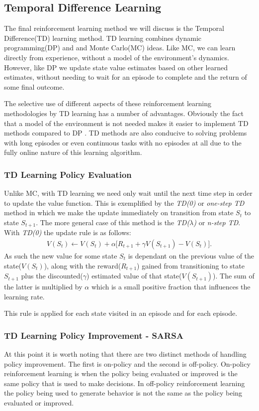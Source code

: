 \subsection{Temporal Difference Learning}\label{subsec:td}
The final reinforcement learning method we will discuss is the Temporal Difference(TD) learning method.
TD learning combines dynamic programming(DP) and and Monte Carlo(MC) ideas\citep{sutton1998reinforcement}.
Like MC, we can learn directly from experience, without a model of the environment's dynamics.
However, like DP we update state value estimates based on other learned estimates, without needing to wait for an
episode to complete and the return of some final outcome.

The selective use of different aspects of these reinforcement learning methodologies by TD learning has
a number of advantages.
Obviously the fact that a model of the environment is not needed makes it easier to implement TD methods
compared to DP .
TD methods are also conducive to solving problems with long episodes or even continuous tasks with no
episodes at all due to the fully online nature of this learning algorithm.

\subsubsection{TD Learning Policy Evaluation}
Unlike MC, with TD learning we need only wait until the next time step in order to update the value function.
This is exemplified by the \textit{TD(0)} or \textit{one-step TD} method in which we make the
update immediately on transition from state $S_t$ to state $S_{t+1}$.
The more general case of this method is the \textit{TD($\lambda$)} or \textit{n-step TD}.
With \textit{TD(0)} the update rule is as follows:
\begin{align}
    V(S_t) \leftarrow V(S_t) + \alpha \lbrack R_{t+1} + \gamma V(S_{t+1}) - V(S_t) \rbrack.
\end{align}
As such the new value for some state $S_t$ is dependant on the previous value of the state($V(S_t)$),
along with the reward($R_{t+1}$) gained from transitioning to state $S_{t+1}$ plus the discounted($\gamma$)
estimated value of that state($V(S_{t+1})$).
The sum of the latter is multiplied by $\alpha$ which is a small positive fraction that influences the
learning rate.

This rule is applied for each state visited in an episode and for each episode.

\subsubsection{TD Learning Policy Improvement - SARSA}
At this point it is worth noting that there are two distinct methods of handling policy improvement.
The first is on-policy and the second is off-policy.
On-policy reinforcement learning is when the policy being evaluated or improved is the same policy that is used
to make decisions.
In off-policy reinforcement learning the policy being used to generate behavior is not the same as the policy
being evaluated or improved.

